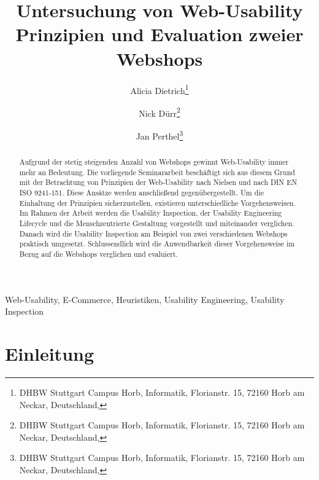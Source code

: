 \documentclass[utf8,biblatex]{lni}
\begin{document}
\title[Untersuchung von Web-Usability Prinzipien und Evaluation zweier Webshops]{Untersuchung von Web-Usability Prinzipien und Evaluation zweier Webshops}

\author[Alicia Dietrich \and Nick Dürr \and Jan Perthel]
{Alicia Dietrich\footnote{DHBW Stuttgart Campus Horb, Informatik, Florianstr. 15, 72160 Horb am Neckar, Deutschland, } \and
 Nick D\"urr\footnote{DHBW Stuttgart Campus Horb, Informatik, Florianstr. 15, 72160 Horb am Neckar, Deutschland, } \and
 Jan Perthel\footnote{DHBW Stuttgart Campus Horb, Informatik, Florianstr. 15, 72160 Horb am Neckar, Deutschland, }}

\maketitle



\begin{abstract}
Aufgrund der stetig steigenden Anzahl von Webshops gewinnt Web-Usability immer mehr an Bedeutung. Die vorliegende Seminararbeit beschäftigt sich aus diesem Grund mit der Betrachtung von Prinzipien der Web-Usability nach Nielsen und nach DIN EN ISO 9241-151. Diese Ansätze werden anschließend gegenübergestellt. Um die Einhaltung der Prinzipien sicherzustellen, existieren unterschiedliche Vorgehensweisen. Im Rahmen der Arbeit werden die Usability Inspection, der Usability Engineering Lifecycle und die Menschzentrierte Gestaltung vorgestellt und miteinander verglichen. Danach wird die Usability Inspection am Beispiel von zwei verschiedenen Webshops praktisch umgesetzt. Schlussendlich wird die Anwendbarkeit dieser Vorgehensweise im Bezug auf die Webshops verglichen und evaluiert.
\end{abstract}



\begin{keywords}
Web-Usability, E-Commerce, Heuristiken, Usability Engineering, Usability Inspection
\end{keywords}



\section{Einleitung}
\end{document}

